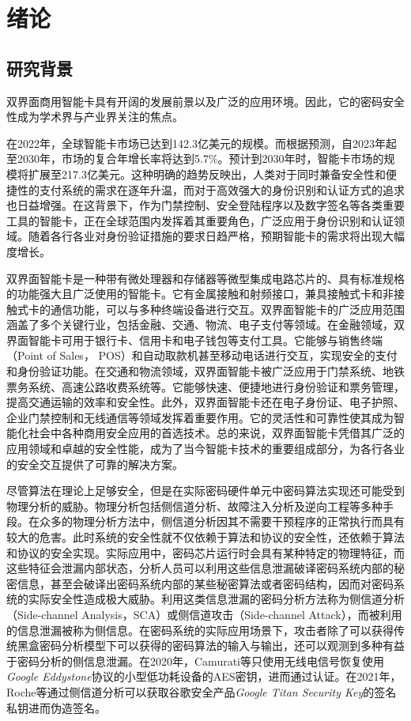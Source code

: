 \chapter{绪论}\label{chap:introduction}{
	\section{研究背景}
	双界面商用智能卡具有开阔的发展前景以及广泛的应用环境。因此，它的密码安全性成为学术界与产业界关注的焦点。
	
	在2022年，全球智能卡市场已达到142.3亿美元的规模。而根据预测，自2023年起至2030年，市场的复合年增长率将达到5.7\%\citep{GVR-1-68038-464-2}。预计到2030年时，智能卡市场的规模将扩展至217.3亿美元。这种明确的趋势反映出，人类对于同时兼备安全性和便捷性的支付系统的需求在逐年升温，而对于高效强大的身份识别和认证方式的追求也日益增强。在这背景下，作为门禁控制、安全登陆程序以及数字签名等各类重要工具的智能卡，正在全球范围内发挥着其重要角色，广泛应用于身份识别和认证领域。随着各行各业对身份验证措施的要求日趋严格，预期智能卡的需求将出现大幅度增长。
	
	双界面智能卡是一种带有微处理器和存储器等微型集成电路芯片的、具有标准规格的功能强大且广泛使用的智能卡。它有金属接触和射频接口，兼具接触式卡和非接触式卡的通信功能，可以与多种终端设备进行交互。双界面智能卡的广泛应用范围涵盖了多个关键行业，包括金融、交通、物流、电子支付等领域。在金融领域，双界面智能卡可用于银行卡、信用卡和电子钱包等支付工具。它能够与销售终端（Point of Sales， POS）和自动取款机甚至移动电话进行交互，实现安全的支付和身份验证功能。在交通和物流领域，双界面智能卡被广泛应用于门禁系统、地铁票务系统、高速公路收费系统等。它能够快速、便捷地进行身份验证和票务管理，提高交通运输的效率和安全性。此外，双界面智能卡还在电子身份证、电子护照、企业门禁控制和无线通信等领域发挥着重要作用。它的灵活性和可靠性使其成为智能化社会中各种商用安全应用的首选技术。总的来说，双界面智能卡凭借其广泛的应用领域和卓越的安全性能，成为了当今智能卡技术的重要组成部分，为各行各业的安全交互提供了可靠的解决方案。
	
	尽管算法在理论上足够安全，但是在实际密码硬件单元中密码算法实现还可能受到物理分析的威胁。物理分析包括侧信道分析、故障注入分析\citep{Biham97}及逆向工程\citep{Perrin17}等多种手段。在众多的物理分析方法中，侧信道分析因其不需要干预程序的正常执行而具有较大的危害。此时系统的安全性就不仅依赖于算法和协议的安全性，还依赖于算法和协议的安全实现。实际应用中，密码芯片运行时会具有某种特定的物理特征，而这些特征会泄漏内部状态，分析人员可以利用这些信息泄漏破译密码系统内部的秘密信息，甚至会破译出密码系统内部的某些秘密算法或者密码结构，因而对密码系统的实际安全性造成极大威胁。利用这类信息泄漏的密码分析方法称为侧信道分析（Side-channel Analysis，SCA）或侧信道攻击（Side-channel Attack），而被利用的信息泄漏被称为侧信息。在密码系统的实际应用场景下，攻击者除了可以获得传统黑盒密码分析模型下可以获得的密码算法的输入与输出，还可以观测到多种有益于密码分析的侧信息泄漏。在2020年，Camurati等\citep{Camurati20}只使用无线电信号恢复使用\textit{Google Eddystone}\citep{Eddystone}协议的小型低功耗设备的AES密钥，进而通过认证。在2021年，Roche等\citep{Roche21}通过侧信道分析可以获取谷歌安全产品\textit{Google Titan Security Key}\citep{Titan}的签名私钥进而伪造签名。
	
}
